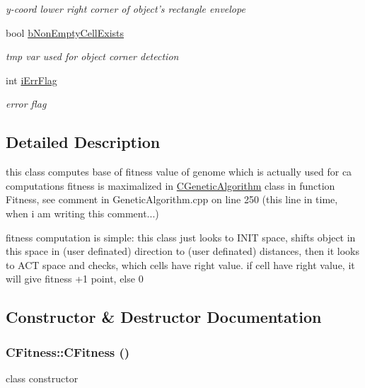 \begin{DoxyCompactItemize}
\begin{DoxyCompactList}\small\item\em y-\/coord lower right corner of object's rectangle envelope \item\end{DoxyCompactList}\item 
\hypertarget{classCFitness_acf3167240f33b65d7e10bc98de56a9c2}{
bool \hyperlink{classCFitness_acf3167240f33b65d7e10bc98de56a9c2}{bNonEmptyCellExists}}
\label{classCFitness_acf3167240f33b65d7e10bc98de56a9c2}

\begin{DoxyCompactList}\small\item\em tmp var used for object corner detection \item\end{DoxyCompactList}\item 
\hypertarget{classCFitness_a444d921fb45192d764a5046a4432e61b}{
int \hyperlink{classCFitness_a444d921fb45192d764a5046a4432e61b}{iErrFlag}}
\label{classCFitness_a444d921fb45192d764a5046a4432e61b}

\begin{DoxyCompactList}\small\item\em error flag \item\end{DoxyCompactList}\end{DoxyCompactItemize}


\subsection{Detailed Description}
this class computes base of fitness value of genome which is actually used for ca computations fitness is maximalized in \hyperlink{classCGeneticAlgorithm}{CGeneticAlgorithm} class in function Fitness, see comment in GeneticAlgorithm.cpp on line 250 (this line in time, when i am writing this comment...)

fitness computation is simple: this class just looks to INIT space, shifts object in this space in (user definated) direction to (user definated) distances, then it looks to ACT space and checks, which cells have right value. if cell have right value, it will give fitness +1 point, else 0 

\subsection{Constructor \& Destructor Documentation}
\hypertarget{classCFitness_a8d4721645167435856bb00ed4d5406e2}{
\subsubsection[{CFitness}]{\setlength{\rightskip}{0pt plus 5cm}CFitness::CFitness ()}}
\label{classCFitness_a8d4721645167435856bb00ed4d5406e2}
class constructor 


